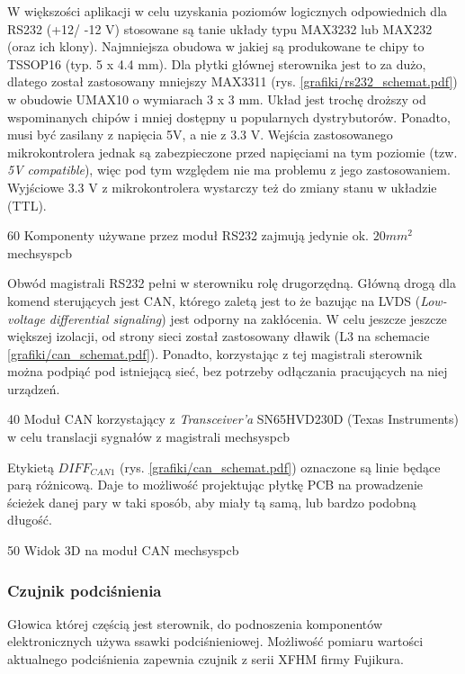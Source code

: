 W większości aplikacji w celu uzyskania poziomów logicznych odpowiednich dla RS232 (+12/ -12 V) stosowane są tanie układy typu MAX3232 lub MAX232 (oraz ich klony). Najmniejsza obudowa w jakiej są produkowane te chipy to TSSOP16 (typ. 5 x 4.4 mm). Dla płytki głównej sterownika jest to za dużo, dlatego został zastosowany mniejszy   MAX3311 (rys. \ref{grafiki/rs232_schemat.pdf}) w obudowie UMAX10 o wymiarach 3 x 3 mm. Układ jest trochę droższy od wspominanych chipów i mniej dostępny u popularnych dystrybutorów. Ponadto, musi być zasilany z napięcia 5V, a nie z 3.3 V. Wejścia zastosowanego mikrokontrolera jednak są zabezpieczone przed napięciami na tym poziomie (tzw. {\it 5V compatible}), więc pod tym względem nie ma problemu z jego zastosowaniem. Wyjściowe 3.3 V z mikrokontrolera wystarczy też do zmiany stanu w układzie (TTL).

	{60}
	{Komponenty używane przez moduł RS232 zajmują jedynie ok. $ 20 mm^2 $}
	{mechsyspcb}

Obwód magistrali RS232 pełni w sterowniku rolę drugorzędną. Główną drogą dla komend sterujących jest CAN, którego zaletą jest to że bazując na LVDS ({\it Low-voltage differential signaling}) jest odporny na zakłócenia. W celu jeszcze jeszcze większej izolacji, od strony sieci został zastosowany dławik (L3 na schemacie \ref{grafiki/can_schemat.pdf}). Ponadto, korzystając z tej magistrali sterownik można podpiąć pod istniejącą sieć, bez potrzeby odłączania pracujących na niej urządzeń.

	{40}
	{Moduł CAN korzystający z {\it Transceiver'a} SN65HVD230D (Texas Instruments) w celu translacji sygnałów z magistrali}
	{mechsyspcb}
	
Etykietą $ DIFF_{CAN1} $ (rys. \ref{grafiki/can_schemat.pdf}) oznaczone są linie będące parą różnicową. Daje to możliwość projektując płytkę PCB na prowadzenie ścieżek danej pary w taki sposób, aby miały tą samą, lub bardzo podobną długość.

	{50}
	{Widok 3D na moduł CAN}
	{mechsyspcb}
	
\subsubsection{Czujnik podciśnienia}
\label{sss:pressure_sensor}

Głowica której częścią jest sterownik, do podnoszenia komponentów elektronicznych używa ssawki podciśnieniowej. Możliwość pomiaru wartości aktualnego podciśnienia zapewnia czujnik z serii XFHM firmy Fujikura. 

